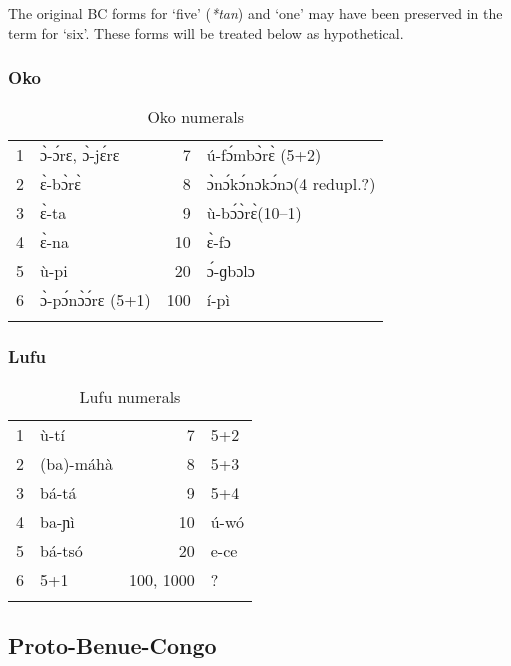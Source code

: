 The original BC forms for ‘five’ (\textit{*tan}) and ‘one’ may have been preserved in the term for ‘six’. These forms will be treated below as hypothetical.

\clearpage
\subsubsection{Oko}\label{sec:3.1.3.3}
\begin{table}
\caption{\label{tab:3:51}Oko numerals }


\begin{tabularx}{.75\textwidth}{rXrl}
\lsptoprule

{1} & {\`{ɔ}}-{\'{ɔ}}rɛ, {\`{ɔ}}-j{\'{ɛ}}rɛ & {7} & ú-f{\'{ɔ}}mb{\`{ɔ}}r{\`{ɛ}} (5+2)\\
{2} & {\`{ɛ}}-b{\`{ɔ}}r{\`{ɛ}} & {8} & {\`{ɔ}}n{\'{ɔ}}k{\'{ɔ}}nɔk{\'{ɔ}}nɔ(4 redupl.?)\\
{3} & {\`{ɛ}}-ta & {9} & ù-b{\'{ɔ}}{\`{ɔ}}r{\`{ɛ}}(10--1)\\
{4} & {\`{ɛ}}-na & {10} & {\`{ɛ}}-fɔ\\
{5} & ù-pi & {20} & {\'{ɔ}}-ɡbɔlɔ\\
{6} & {\`{ɔ}}-p{\'{ɔ}}n{\`{ɔ}}{\'{ɔ}}rɛ (5+1) & {100} & í-pì\\
\lspbottomrule
\end{tabularx}
\end{table}

 
\subsubsection{Lufu}\label{sec:3.1.3.4}

\begin{table}
\caption{\label{tab:3:52}Lufu numerals}


\begin{tabularx}{.75\textwidth}{rXrl}
\lsptoprule

{1} & ù-tí & {7} & 5+2\\
{2} & (ba)-máhà & {8} & 5+3\\
{3} & bá-tá & {9} & 5+4\\
{4} & ba-ɲì & {10} & ú-wó\\
{5} & bá-tsó & {20} & e-ce\\
{6} & 5+1 & {100,} {1000} & ? \\
\lspbottomrule
\end{tabularx}
\end{table}

 
\subsection{Proto-Benue-Congo}\label{sec:3.1.4}

